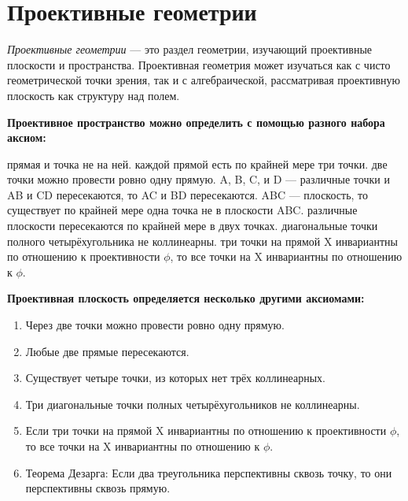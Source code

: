 \documentclass[12pt]{article}
\begin{document}
    \section{Проективные геометрии}
    \textit{Проективные геометрии} — это раздел геометрии, изучающий проективные плоскости и пространства. Проективная геометрия может изучаться как с чисто геометрической точки зрения, так и с алгебраической, рассматривая проективную плоскость как структуру над полем.\newline

    \textbf{Проективное пространство можно определить с помощью разного набора аксиом:}
    \begin{enumerate}
         прямая и точка не на ней.
         каждой прямой есть по крайней мере три точки.
         две точки можно провести ровно одну прямую.
         A, B, C, и D — различные точки и AB и CD пересекаются, то AC и BD пересекаются.
         ABC — плоскость, то существует по крайней мере одна точка не в плоскости ABC.
         различные плоскости пересекаются по крайней мере в двух точках.
         диагональные точки полного четырёхугольника не коллинеарны.
         три точки на прямой X инвариантны по отношению к проективности $\phi$, то все точки на X инвариантны по отношению к $\phi$.\newline\newline
    \end{enumerate}

    \textbf{Проективная плоскость определяется несколько другими аксиомами:}
    \begin{enumerate}
        \item Через две точки можно провести ровно одну прямую.
        \item Любые две прямые пересекаются.
        \item Существует четыре точки, из которых нет трёх коллинеарных.
        \item Три диагональные точки полных четырёхугольников не коллинеарны.
        \item Если три точки на прямой X инвариантны по отношению к проективности $\phi$, то все точки на X инвариантны по отношению к $\phi$.
        \item Теорема Дезарга: Если два треугольника перспективны сквозь точку, то они перспективны сквозь прямую.\newline\newline
    \end{enumerate}
\end{document}
